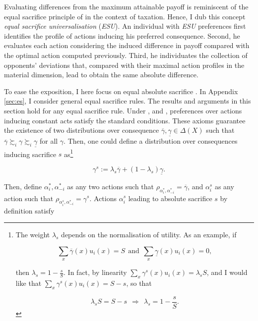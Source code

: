 Evaluating differences from the maximum attainable payoff is reminiscent of the equal sacrifice principle of \cite{millPrinciplesPoliticalEconomy1885} in the context of taxation. Hence, I dub this concept \textit{equal sacrifice universalisation} (\textit{ESU}). An individual with \textit{ESU} preferences first identifies the profile of actions inducing his preferred consequence. Second, he  evaluates each action considering the induced difference in payoff compared with the optimal action computed previously. Third, he individuates the collection of opponents' deviations that, compared with their maximal action profiles in the material dimension, lead to obtain the same absolute difference.

To ease the exposition, I here focus on equal absolute sacrifice \citep{youngDistributiveJusticeTaxation1988}. In Appendix \ref{sec:es}, I consider general equal sacrifice rules. The results and arguments in this section hold for any equal sacrifice rule. Under ,  and , preferences over actions inducing constant acts satisfy the standard \citeauthor{anscombeDefinitionSubjectiveProbability1963} conditions. These axioms guarantee the existence of two distributions over consequence \( \overline{\gamma}, \underline{\gamma} \in \Delta (X) \) such that \( \overline{\gamma} \succsim_i \gamma \succsim_i \underline{\gamma} \) for all \( \gamma \). Then, one could define a distribution over consequences inducing sacrifice \( s \) as\footnote{The weight \( \lambda_s \) depends on the normalisation of utility. As an example, if

	\[
		\sum_{x} \overline{\gamma} (x) u_i (x) = S \: \: \text{and} \: \: \sum_{x} \underline{\gamma} (x) u_i (x) = 0,
	\]

	then \( \lambda_s = 1 - \frac{s}{S} \). In fact, by linearity \( \sum_{x} \gamma^s (x) u_i (x) = \lambda_s S \), and I would like that \( \sum_{x} \gamma^s (x) u_i (x) = S - s \), so that

	\[
		\lambda_s S = S - s \: \: \Rightarrow \: \: \lambda_s = 1 - \frac{s}{S} .
	\]}

\[ \gamma^s := \lambda_s \overline{\gamma} + (1- \lambda_s) \underline{\gamma} .\]

Then, define \( \alpha_i^{*}, \alpha_{-i}^{*} \) as any two actions such that \( \rho_{\alpha_i^{*}, \alpha_{-i}^{*}} = \overline{\gamma} \), and \( \alpha_i^s \) as any action such that \( \rho_{\alpha_i^{s}, \alpha_{-i}^{*}} = \gamma^s \). Actions \( \alpha_i^s \) leading to absolute sacrifice \(s\) by definition satisfy

